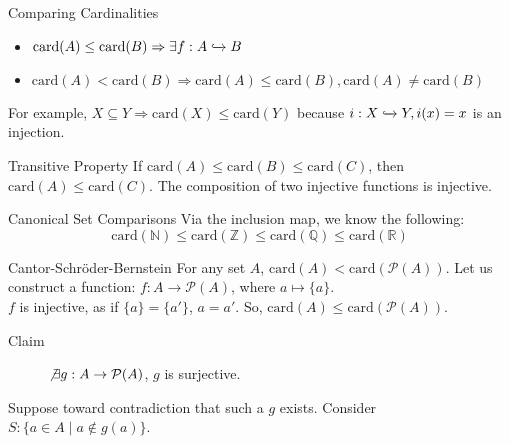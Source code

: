 \documentclass[10pt]{extarticle}
\begin{document}
  \begin{problem}{Comparing Cardinalities}
    \begin{itemize}
      \item $\textrm{card}(A) \leq \text{card}(B) \Rightarrow \exists f: A\xhookrightarrow{} B$ 
      \item $\text{card}(A) < \text{card}(B) \Rightarrow \text{card}(A) \leq \text{card}(B), \text{card}(A) \neq \textrm{card}(B)$
    \end{itemize}
    For example, $X\subseteq Y \Rightarrow \text{card}(X) \leq \text{card}(Y)$ because $i: X\xhookrightarrow{} Y, i(x) = x$ is an injection.\\

    \begin{problem}{Transitive Property}
      If $\text{card}(A) \leq \text{card}(B) \leq \text{card}(C)$, then $\text{card}(A) \leq \text{card}(C)$.
      \tcblower
      The composition of two injective functions is injective.
    \end{problem}
    \begin{problem}{Canonical Set Comparisons}
      Via the inclusion map, we know the following:
      \[
        \text{card}(\mathbb{N}) \leq \text{card}(\mathbb{Z}) \leq \text{card}(\mathbb{Q}) \leq \text{card}(\mathbb{R})
      \] 
    \end{problem}
    \begin{problem}{Cantor-Schröder-Bernstein}
      For any set $A$, $\text{card}(A) < \text{card}(\mathcal{P}(A))$.
      \tcblower
      Let us construct a function: $f: A \rightarrow \mathcal{P}(A)$, where $a \mapsto \{a\}$.\\

      $f$ is injective, as if $\{a\} = \{a'\}$, $a = a'$. So, $\text{card}(A) \leq \text{card}(\mathcal{P}(A))$.
      \begin{description}
        \item[Claim] $\not\exists g: A\rightarrow \mathcal{P}(A)$, $g$ is surjective.
      \end{description}
      Suppose toward contradiction that such a $g$ exists. Consider $S: \{a\in A \mid a\notin g(a)\}$.\\


\end{problem}
\end{problem}
\end{document}
